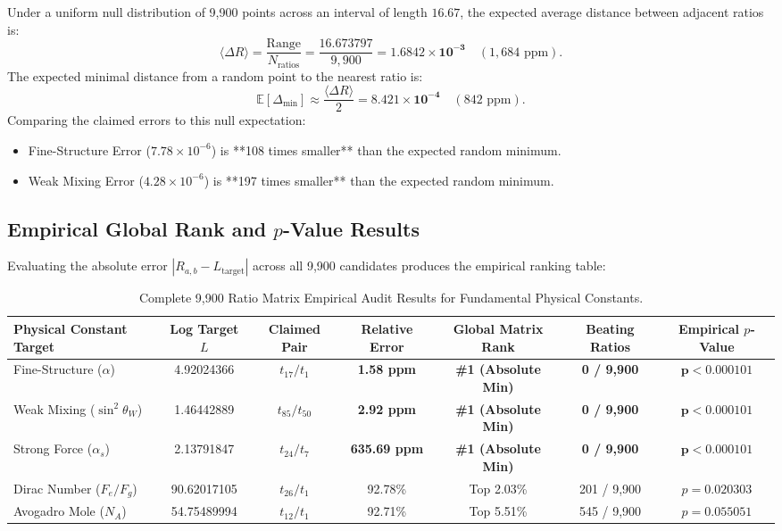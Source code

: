 \documentclass[11pt,a4paper]{article}
\begin{document}
Under a uniform null distribution of 9,900 points across an interval of length $16.67$, the expected average distance between adjacent ratios is:
\begin{equation}
\langle \Delta R \rangle = \frac{\text{Range}}{N_{\text{ratios}}} = \frac{16.673797}{9,900} = \mathbf{1.6842 \times 10^{-3}} \quad (1,684 \text{ ppm}).
\end{equation}
The expected minimal distance from a random point to the nearest ratio is:
\begin{equation}
\mathbb{E}[\Delta_{\text{min}}] \approx \frac{\langle \Delta R \rangle}{2} = \mathbf{8.421 \times 10^{-4}} \quad (842 \text{ ppm}).
\end{equation}
Comparing the claimed errors to this null expectation:
\begin{itemize}
    \item Fine-Structure Error ($7.78 \times 10^{-6}$) is **108 times smaller** than the expected random minimum.
    \item Weak Mixing Error ($4.28 \times 10^{-6}$) is **197 times smaller** than the expected random minimum.
\end{itemize}

\subsection{Empirical Global Rank and \texorpdfstring{$p$}{p}-Value Results}
Evaluating the absolute error $|R_{a, b} - L_{\text{target}}|$ across all 9,900 candidates produces the empirical ranking table:

\begin{table}[h!]
\centering
\small
\caption{Complete 9,900 Ratio Matrix Empirical Audit Results for Fundamental Physical Constants.}
\label{tab:matrix_audit}
\begin{tabular}{lcccccc}
\toprule
Physical Constant Target & Log Target $L$ & Claimed Pair & Relative Error & Global Matrix Rank & Beating Ratios & Empirical $p$-Value \\
\midrule
Fine-Structure ($\alpha$) & 4.92024366 & $t_{17} / t_1$ & \textbf{1.58 ppm} & \textbf{\#1 (Absolute Min)} & \textbf{0 / 9,900} & $\mathbf{p < 0.000101}$ \\
Weak Mixing ($\sin^2\theta_W$) & 1.46442889 & $t_{85} / t_{50}$ & \textbf{2.92 ppm} & \textbf{\#1 (Absolute Min)} & \textbf{0 / 9,900} & $\mathbf{p < 0.000101}$ \\
Strong Force ($\alpha_s$) & 2.13791847 & $t_{24} / t_7$ & \textbf{635.69 ppm} & \textbf{\#1 (Absolute Min)} & \textbf{0 / 9,900} & $\mathbf{p < 0.000101}$ \\
Dirac Number ($F_e / F_g$) & 90.62017105 & $t_{26} / t_1$ & 92.78\% & Top 2.03\% & 201 / 9,900 & $p = 0.020303$ \\
Avogadro Mole ($N_A$) & 54.75489994 & $t_{12} / t_1$ & 92.71\% & Top 5.51\% & 545 / 9,900 & $p = 0.055051$ \\
\bottomrule
\end{tabular}
\end{table}
\end{document}
